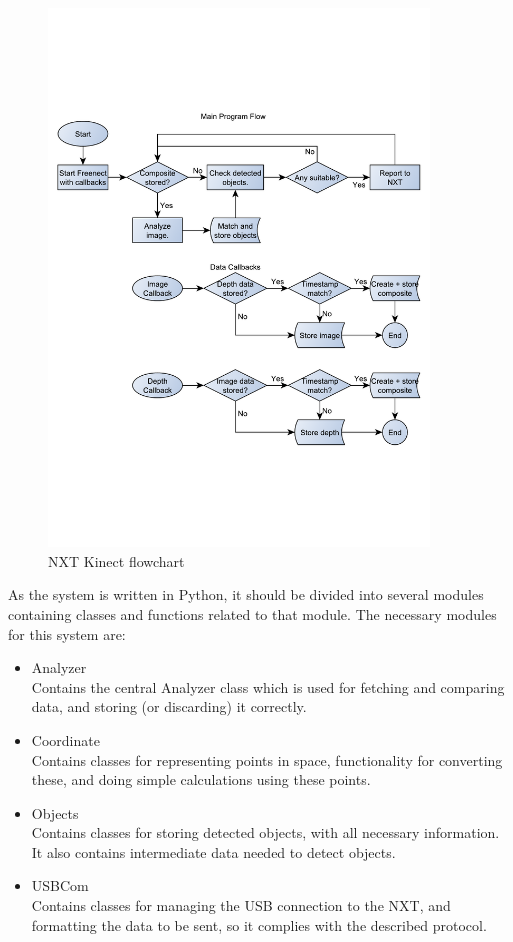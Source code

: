 \begin{figure}[hbtp]
\includegraphics[width=0.90\textwidth]{img/nxtkinectflow.pdf}
\caption{NXT Kinect flowchart} 
\label{fig:nxtkinectflow} 
\end{figure}

As the system is written in Python, it should be divided into several modules containing classes
and functions related to that module. The necessary modules for this system are:
\begin{itemize}
  \item{Analyzer}\\
  Contains the central Analyzer class which is used for fetching and comparing data, and storing (or discarding) it
  correctly.
  \item{Coordinate}\\
  Contains classes for representing points in space, functionality for converting these, and doing simple calculations
  using these points.
  \item{Objects}\\
  Contains classes for storing detected objects, with all necessary information. It also contains intermediate data needed to
  detect objects.
  \item{USBCom} \\
  Contains classes for managing the USB connection to the NXT, and formatting the data to be sent, so it complies with
  the described protocol.
\end{itemize}

